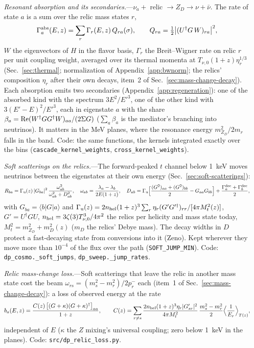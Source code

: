 \documentclass[11pt,a4paper]{article}
\newcommand{\file}[1]{\nolinkurl{#1}}
\newcommand{\mzd}{m_{Z_D}}
\begin{document}
\textit{Resonant absorption and its secondaries.}---$\nu_a + $ relic $\to Z_D \to \nu + \bar\nu$. The rate of state $a$
is a sum over the relic mass states $r$,
\begin{equation}
\Gamma^{\rm abs}_a(E, z) = \sum_r \Gamma_r(E, z)\,Q_{ra}(\sigma), \qquad Q_{ra} = \tfrac12\big|(U^\dagger G\,W)_{ra}\big|^2,
\end{equation}
$W$ the eigenvectors of $H$ in the flavor basis, $\Gamma_r$ the Breit--Wigner rate on relic $r$ per unit coupling weight,
averaged over its thermal momenta at $T_{\nu,0}(1+z)\eta_r^{1/3}$ (Sec.~\ref{sec:thermal}; normalization of
Appendix~\ref{app:bwnorm}; the relics' composition $\eta_r$ after their own decays, item~2 of
Sec.~\ref{sec:mass-change-decay}). Each absorption emits two secondaries (Appendix~\ref{app:regeneration}): one of the
absorbed kind with the spectrum $3E^2/E'^3$, one of the other kind with $3(E'-E)^2/E'^3$, each in eigenstate $a$ with
the share $\beta_a = {\rm Re}(W^\dagger GG^\dagger W)_{aa}/(2\Sigma G)$ ($\sum_a\beta_a$ is the mediator's branching
into neutrinos). It matters in the MeV planes, where the resonance energy $\mzd^2/2m_r$ falls in the band. Code: the
same functions, the kernels integrated exactly over the bins (\texttt{cascade\_kernel\_weights},
\texttt{cross\_kernel\_weights}).

\textit{Soft scatterings on the relics.}---The forward-peaked $t$ channel below 1~keV moves neutrinos between the
eigenstates at their own energy (Sec.~\ref{sec:soft-scatterings}):
\begin{equation}
R_{ba} = \Gamma_{\rm u}(z)\,|G_{ba}|^2\,\frac{\omega_{ab}^2}{\omega_{ab}^2 + D_{ab}^2},\quad
\omega_{ab} = \frac{\lambda_a - \lambda_b}{2E(1+z)},\quad
D_{ab} = \Gamma_{\rm u}\Big[\frac{(G^2)_{aa} + (G^2)_{bb}}{2} - G_{aa}G_{bb}\Big] + \frac{\Gamma^{\rm dec}_a + \Gamma^{\rm dec}_b}{2},
\end{equation}
with $G_{ba} = \langle b|G|a\rangle$ and
$\Gamma_{\rm u}(z) = 2n_{\rm hel}(1+z)^3\sum_r\eta_r(G'G'^\dagger)_{rr}/[4\pi M_t^2(z)]$, $G' = U^\dagger GU$,
$n_{\rm hel} = 3\zeta(3)T_{\nu,0}^3/4\pi^2$ the relics per helicity and mass state today, $M_t^2 = \mzd^2 + m_D^2(z)$
($m_D$ the relics' Debye mass). The decay widths in $D$ protect a fast-decaying state from conversions into it (Zeno).
Kept wherever they move more than $10^{-4}$ of the flux over the path (\texttt{SOFT\_JUMP\_MIN}). Code:
\texttt{dp\_cosmo.\_soft\_jumps}, \texttt{dp\_sweep.\_jump\_rates}.

\textit{Relic mass-change loss.}---Soft scatterings that leave the relic in another mass state cost the beam
$\omega_{rs} = (m_s^2 - m_r^2)/2p_r^-$ each (item~1 of Sec.~\ref{sec:mass-change-decay}): a loss of observed energy at
the rate
\begin{equation}
b_a(E, z) = \frac{C(z)\,\big[(G + \kappa)(G + \kappa)^\dagger\big]_{aa}}{1+z},\qquad
C(z) = \sum_{r\ne s}\frac{2n_{\rm hel}(1+z)^3\eta_r|G'_{sr}|^2}{4\pi M_t^2}\,\frac{m_s^2 - m_r^2}{2}
\Big\langle\frac{1}{E_r}\Big\rangle_{T(z)},
\end{equation}
independent of $E$ ($\kappa$ the $Z$ mixing's universal coupling; zero below 1~keV in the planes). Code:
\file{src/dp\_relic\_loss.py}.
\end{document}
